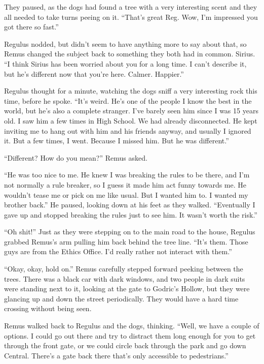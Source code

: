 \documentclass[12pt,twoside,openright]{memoir}
\begin{document}
They paused, as the dogs had found a tree with a very interesting scent and they all needed to take turns peeing on it.
``That's great Reg. Wow, I'm impressed you got there so fast.''

Regulus nodded, but didn't seem to have anything more to say about that, so Remus changed the subject back to something they both had in common. Sirius. ``I think Sirius has been worried about you for a long time. I can't describe it, but he's different now that you're here. Calmer. Happier.''

Regulus thought for a minute, watching the dogs sniff a very interesting rock this time, before he spoke. ``It's weird. He's one of the people I know the best in the world, but he's also a complete stranger. I've barely seen him since I was 15 years old. I saw him a few times in High School. We had already disconnected. He kept inviting me to hang out with him and his friends anyway, and usually I ignored it. But a few times, I went. Because I missed him. But he was different.''

``Different? How do you mean?'' Remus asked.

``He was too nice to me. He knew I was breaking the rules to be there, and I'm not normally a rule breaker, so I guess it made him act funny towards me. He wouldn't tease me or pick on me like usual. But I wanted him to. I wanted my brother back.'' He paused, looking down at his feet as they walked. ``Eventually I gave up and stopped breaking the rules just to see him. It wasn't worth the risk.''

``Oh shit!'' Just as they were stepping on to the main road to the house, Regulus grabbed Remus's arm pulling him back behind the tree line. ``It's them. Those guys are from the Ethics Office. I'd really rather not interact with them.''

``Okay, okay, hold on.'' Remus carefully stepped forward peeking between the trees. There was a black car with dark windows, and two people in dark suits were standing next to it, looking at the gate to Godric's Hollow, but they were glancing up and down the street periodically. They would have a hard time crossing without being seen.

Remus walked back to Regulus and the dogs, thinking. ``Well, we have a couple of options. I could go out there and try to distract them long enough for you to get through the front gate, or we could circle back through the park and go down Central. There's a gate back there that's only accessible to pedestrians.'' 
\end{document}

